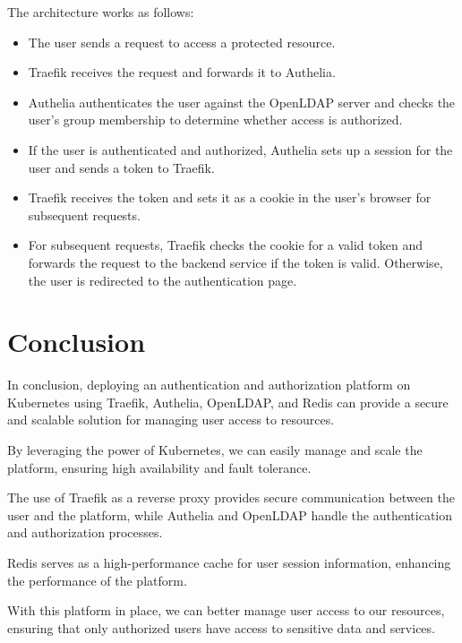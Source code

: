The architecture works as follows: 
\begin{itemize}[label={--}]
\item The user sends a request to access a protected resource. 
\item  Traefik receives the request and forwards it to Authelia. 
\item  Authelia authenticates the user against the OpenLDAP server and checks the user's group membership to determine whether access is authorized. 
\item  If the user is authenticated and authorized, Authelia sets up a session for the user and sends a token to Traefik. 
\item  Traefik receives the token and sets it as a cookie in the user's browser for subsequent requests. 
\item  For subsequent requests, Traefik checks the cookie for a valid token and forwards the request to the backend service if the token is valid. Otherwise, the user is redirected to the authentication page.  
\end{itemize}

\section*{Conclusion}

In conclusion, deploying an authentication and authorization platform on Kubernetes using Traefik, Authelia, OpenLDAP, and Redis can provide a secure and scalable solution for managing user access to resources. 

By leveraging the power of Kubernetes, we can easily manage and scale the platform, ensuring high availability and fault tolerance. 

The use of Traefik as a reverse proxy provides secure communication between the user and the platform, while Authelia and OpenLDAP handle the authentication and authorization processes. 

Redis serves as a high-performance cache for user session information, enhancing the performance of the platform. 

With this platform in place, we can better manage user access to our resources, ensuring that only authorized users have access to sensitive data and services.